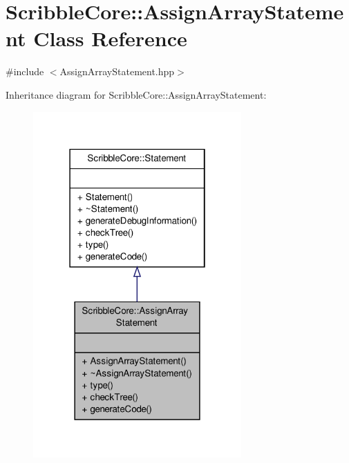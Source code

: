 \hypertarget{class_scribble_core_1_1_assign_array_statement}{\section{Scribble\-Core\-:\-:Assign\-Array\-Statement Class Reference}
\label{class_scribble_core_1_1_assign_array_statement}
}


{\ttfamily \#include $<$Assign\-Array\-Statement.\-hpp$>$}



Inheritance diagram for Scribble\-Core\-:\-:Assign\-Array\-Statement\-:
\nopagebreak
\begin{figure}[H]
\begin{center}
\leavevmode
\includegraphics[width=226pt]{class_scribble_core_1_1_assign_array_statement__inherit__graph}
\end{center}
\end{figure}


